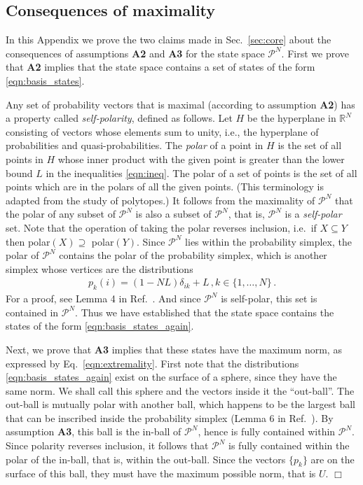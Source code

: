 \documentclass[%
 reprint,superscriptaddress,
 amsmath,amssymb,
 aps,twocolumn,pra
]{revtex4-1}
\newcommand{\eqn}[1]{\begin{eqnarray} #1 \end{eqnarray}}
\newcommand{\tit}[1]{\textit{#1}}
\begin{document}
\begin{appendix}
\section{Consequences of maximality \label{app:vitality2}}
In this Appendix we prove the two claims made in Sec.\ \ref{sec:core} about the consequences of assumptions {\bf A2} and {\bf A3} for the state space $\mathcal{P}^{N}$. First we prove that {\bf A2} implies that the state space contains a set of states of the form \eqref{eqn:basis_states}.

Any set of probability vectors that is maximal (according to assumption {\bf A2}) has a property called \tit{self-polarity}, defined as follows. Let $H$ be the hyperplane in $\mathbb{R}^{N}$ consisting of vectors whose elements sum to unity, i.e., the hyperplane of probabilities and quasi-probabilities. The \tit{polar} of a point in $H$ is the set of all points in $H$ whose inner product with the given point is greater than the lower bound $L$ in the inequalities \eqref{eqn:ineq}. The polar of a set of points is the set of all points which are in the polars of all the given points. (This terminology is adapted from the study of polytopes.) It follows from the maximality of $\mathcal{P}^N$ that the polar of any subset of $\mathcal{P}^N$ is also a subset of $\mathcal{P}^N$, that is, $\mathcal{P}^N$ is a \tit{self-polar} set.
Note that the operation of taking the polar reverses inclusion, i.e.\ if $X \subseteq Y$ then polar$(X) \supseteq$ polar$(Y)$. Since $\mathcal{P}^{N}$ lies within the probability simplex, the polar of $\mathcal{P}^{N}$ contains the polar of the probability simplex, which is another simplex whose vertices are the distributions
\eqn{ \label{eqn:basis_states_again}
p_k(i) = (1-NL)\delta_{ik} + L \, , k \in \{1,\dots, N\} \, .
}
For a proof, see Lemma 4 in Ref.\ \cite{QPLEX}. And since $\mathcal{P}^{N}$ is self-polar, this set is contained in $\mathcal{P}^{N}$. Thus we have established that the state space contains the states of the form \eqref{eqn:basis_states_again}.

Next, we prove that {\bf A3} implies that these states have the maximum norm, as expressed by Eq.\  \eqref{eqn:extremality}. First note that the distributions \eqref{eqn:basis_states_again} exist on the surface of a sphere, since they have the same norm. We shall call this sphere and the vectors inside it the ``out-ball''. The out-ball is mutually polar with another ball, which happens to be the largest ball that can be inscribed inside the probability simplex (Lemma 6 in Ref.\ \cite{QPLEX}). By assumption {\bf A3}, this ball is the in-ball of $\mathcal{P}^{N}$, hence is fully contained within $\mathcal{P}^{N}$. Since polarity reverses inclusion, it follows that $\mathcal{P}^{N}$ is fully contained within the polar of the in-ball, that is, within the out-ball. Since the vectors $\{p_k \}$ are on the surface of this ball, they must have the maximum possible norm, that is $U$. $\Box$


\end{appendix}
\end{document}
